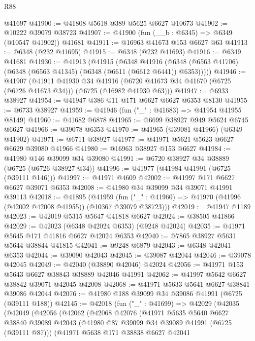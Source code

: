 \begin{lexlean}{R88}
\begin{coremodule}
    @41697
@41900 := @41808 @5618 @389 @5625 @6627 @10673
@41902 := @10222 @39079 @38723
@41907 := @41900 (fun (__b : @6345) => @6349 (@10547 @41902)) @41681
@41911 := @16963 @41673 @153 @6627 @63
@41913 := @6348 (@232 @41695)
@41915 := @6348 (@232 @41693)
@41916 := @6349 @41681
@41930 := @41913
    (@41915
      (@6348
        @41916
        (@6348 (@6563 @41706) (@6348 (@6563 @41345) (@6348 (@6611 (@6612 @6441)) @6353)))))
@41946 := @41907
    (@41911
      @41930
      @34
      @41916
      (@6720 @41673 @34 @41670 (@6725 (@6726 @41673 @34)))
      (@6725 (@16982 @41930 @63)))
@41947 := @6933 @38927
@41954 := @41947 @386 @11 @171 @6627 @6627 @6353 @8130
@41955 := @6733 @38927
@41959 := @41946 (fun ("_" : @41683) => @41954 @41955 @8149)
@41960 := @41682 @6878
@41965 := @6699 @38927 @949 @5624 @6745 @6627
@41966 := @39078 @6353
@41970 := @41965 (@39081 @41966) (@6349 @41902)
@41971 := @6711 @38927
@41977 := @41971 @5621 @5623 @6627 @6629 @39080 @41966
@41980 := @16963 @38927 @153 @6627
@41984 := @41980 @146 @39099 @34 @39080
@41991 := @6720 @38927 @34 @38889 (@6725 (@6726 @38927 @34))
@41996 := @41977 (@41984 @41991 (@6725 (@39111 @146)))
@41997 := @41971 @4609
@42002 := @41997 @171 @6627 @6627 @39071 @6353
@42008 := @41980 @34 @39099 @34 @39071 @41991 @39113
@42018 := @41895
    (@41959 (fun ("_" : @41960) => @41970 (@41996 (@42002 @42008 @41955)) (@10367 @39079 @38723)))
@42019 := @41947 @1189
@42023 := @42019 @5315 @5647 @41818 @6627
@42024 := @38505 @41866
@42029 := @42023 (@6348 @42024 @6353) (@9248 @42024)
@42035 := @41971 @5645 @171 @41816 @6627 @42024 @6353
@42040 := @7865 @38927 @5631 @5644 @38844 @41815
@42041 := @9248 @6879
@42043 := @6348 @42041 @6353
@42044 := @39090 @42043
@42045 := @39087 @42044
@42046 := @39078 @42045
@42049 := @42040 (@38890 @42046) @42024
@42056 := @41971 @153 @5643 @6627 @38843 @38889 @42046 @41991
@42062 := @41997 @5642 @6627 @38842 @39071 @42045 @42008
@42068 := @41971 @5633 @5641 @6627 @38841 @39086 @42044
@42076 := @41980 @188 @39099 @34 @39086 @41991 (@6725 (@39111 @188))
@42145 := @42018
    (fun ("_" : @41699) =>
    @42029
      (@42035
        (@42049
          (@42056
            (@42062
              (@42068
                @42076
                (@41971
                  @5635
                  @5640
                  @6627
                  @38840
                  @39089
                  @42043
                  (@41980 @87 @39099 @34 @39089 @41991 (@6725 (@39111 @87)))
                  (@41971
                    @5638
                    @171
                    @38838
                    @6627
                    @42041

\end{coremodule}
\end{lexlean}
